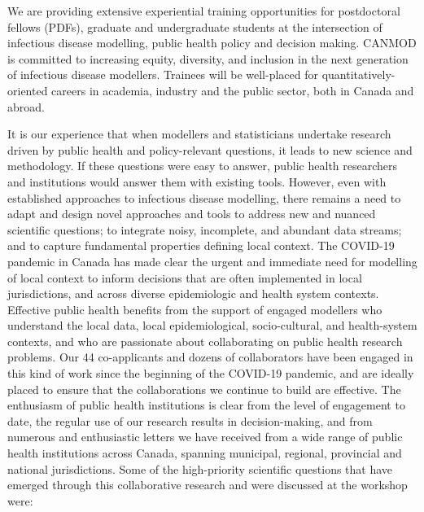 We are providing extensive experiential training opportunities for
postdoctoral fellows (PDFs), graduate and undergraduate students at
the intersection of infectious disease modelling, public health policy
and decision making. CANMOD is committed to increasing equity,
diversity, and inclusion in the next generation of infectious disease
modellers. Trainees will be well-placed for quantitatively-oriented
careers in academia, industry and the public sector, both in Canada
and abroad.

It is our experience that when modellers and statisticians undertake
research driven by public health and policy-relevant questions, it
leads to new science and methodology. If these questions were easy to
answer, public health researchers and institutions would answer them
with existing tools. However, even with established approaches to
infectious disease modelling, there remains a need to adapt and design
novel approaches and tools to address new and nuanced scientific
questions; to integrate noisy, incomplete, and abundant data streams;
and to capture fundamental properties defining local context. The
COVID-19 pandemic in Canada has made clear the urgent and immediate
need for modelling of local context to inform decisions that are often
implemented in local jurisdictions, and across diverse epidemiologic
and health system contexts. Effective public health benefits from the
support of engaged modellers who understand the local data, local
epidemiological, socio-cultural, and health-system contexts, and who
are passionate about collaborating on public health research
problems. Our 44 co-applicants and dozens of collaborators have been
engaged in this kind of work since the beginning of the COVID-19
pandemic, and are ideally placed to ensure that the collaborations we
continue to build are effective. The enthusiasm of public health
institutions is clear from the level of engagement to date, the
regular use of our research results in decision-making, and from
numerous and enthusiastic letters we have received from a wide range
of public health institutions across Canada, spanning municipal,
regional, provincial and national jurisdictions. Some of the
high-priority scientific questions that have emerged through this
collaborative research and were discussed at the workshop
were:

